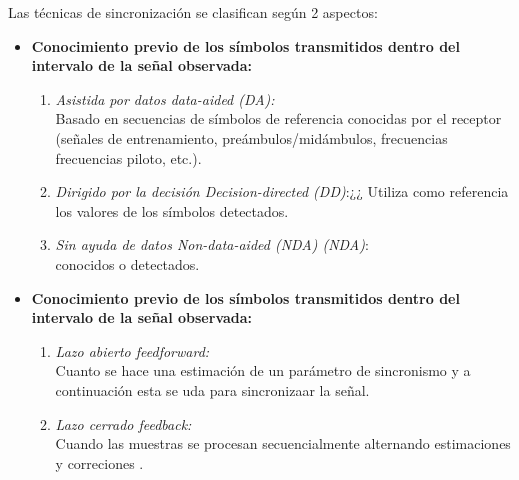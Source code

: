 Las técnicas de sincronización se clasifican según 2 aspectos:

\begin{itemize}
	\item \textbf{Conocimiento previo de los símbolos transmitidos dentro del intervalo de la señal observada:}
	
	\begin{enumerate}
		\item \emph{Asistida por datos data-aided (DA):}
		\\Basado en secuencias de símbolos de referencia conocidas por el
		receptor (señales de entrenamiento, preámbulos/midámbulos, frecuencias
		frecuencias piloto, etc.).
		\item \emph{Dirigido por la decisión Decision-directed (DD)}:¿¿ Utiliza como referencia los valores de los símbolos detectados.
		
		\item \emph{Sin ayuda de datos Non-data-aided (NDA)  (NDA)}:\\ conocidos o detectados. 
	\end{enumerate}

\item \textbf{Conocimiento previo de los símbolos transmitidos dentro del intervalo de la señal observada:}

\begin{enumerate}
	\item  \emph{Lazo abierto feedforward:} \\ Cuanto se hace una estimación de un parámetro de sincronismo y a continuación esta se uda para sincronizaar la señal.
	\item  \emph{Lazo cerrado feedback:}\\ Cuando las muestras se procesan secuencialmente alternando estimaciones y correciones .
\end{enumerate}

\end{itemize}
